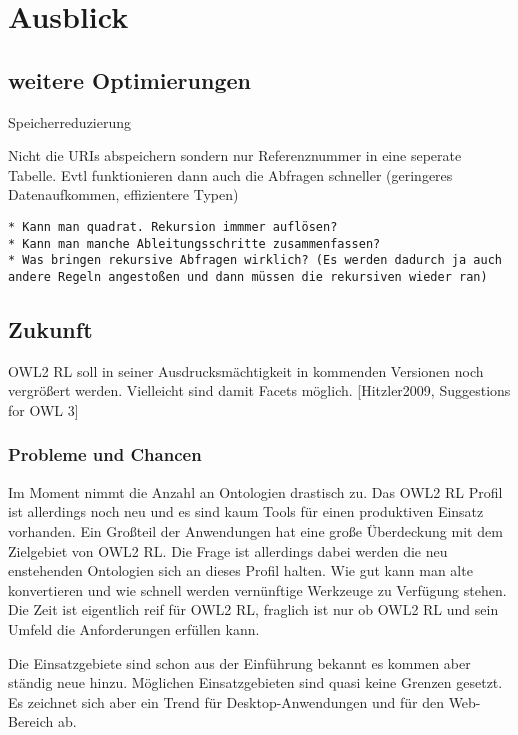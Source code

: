 \chapter{Ausblick}
\label{kapitel-ausblick}

\section{weitere Optimierungen}
Speicherreduzierung

Nicht die URIs abspeichern sondern nur Referenznummer in eine seperate Tabelle. Evtl funktionieren dann auch die Abfragen schneller (geringeres Datenaufkommen, effizientere Typen)

\begin{verbatim} 
* Kann man quadrat. Rekursion immmer auflösen?
* Kann man manche Ableitungsschritte zusammenfassen?
* Was bringen rekursive Abfragen wirklich? (Es werden dadurch ja auch andere Regeln angestoßen und dann müssen die rekursiven wieder ran)
\end{verbatim}

\section{Zukunft}
OWL2 RL soll in seiner Ausdrucksmächtigkeit in kommenden Versionen noch vergrößert werden. Vielleicht sind damit Facets möglich. [Hitzler2009, Suggestions for OWL 3]

\subsection{Probleme und Chancen}
Im Moment nimmt die Anzahl an Ontologien drastisch zu. Das OWL2 RL Profil ist allerdings noch neu und es sind kaum Tools für einen produktiven Einsatz vorhanden. Ein Großteil der Anwendungen hat eine große Überdeckung mit dem Zielgebiet von OWL2 RL. Die Frage ist allerdings dabei werden die neu enstehenden Ontologien sich an dieses Profil halten. Wie gut kann man alte konvertieren und wie schnell werden vernünftige Werkzeuge zu Verfügung stehen. Die Zeit ist eigentlich reif für OWL2 RL, fraglich ist nur ob OWL2 RL und sein Umfeld die Anforderungen erfüllen kann.

Die Einsatzgebiete sind schon aus der Einführung bekannt es kommen aber ständig neue hinzu. Möglichen Einsatzgebieten sind quasi keine Grenzen gesetzt. Es zeichnet sich aber ein Trend für Desktop-Anwendungen und für den Web-Bereich ab.